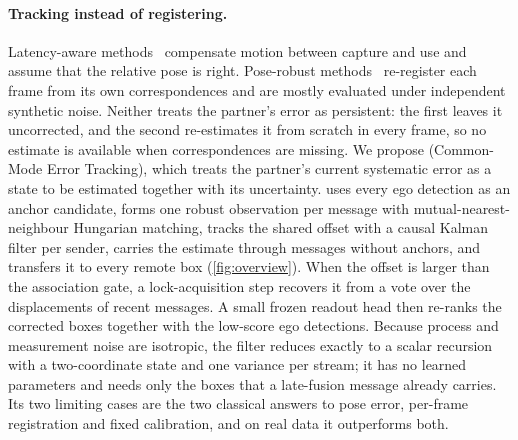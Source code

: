 \paragraph{Tracking instead of registering.}
Latency-aware methods~\cite{lei2022syncnet,wei2023cobevflow,yu2023ffnet,yang2023how2comm,song2025trafalign} compensate motion between capture and use and assume that the relative pose is right.
Pose-robust methods~\cite{lu2023coalign,lei2024freealign,huang2024roco,song2023cbm} re-register each frame from its own correspondences and are mostly evaluated under independent synthetic noise.
Neither treats the partner's error as persistent: the first leaves it uncorrected, and the second re-estimates it from scratch in every frame, so no estimate is available when correspondences are missing.
We propose \method (Common-Mode Error Tracking), which treats the partner's current systematic error as a state to be estimated together with its uncertainty.
\method uses every ego detection as an anchor candidate, forms one robust observation per message with mutual-nearest-neighbour Hungarian matching, tracks the shared offset with a causal Kalman filter per sender, carries the estimate through messages without anchors, and transfers it to every remote box (\cref{fig:overview}).
When the offset is larger than the association gate, a lock-acquisition step recovers it from a vote over the displacements of recent messages.
A small frozen readout head then re-ranks the corrected boxes together with the low-score ego detections.
Because process and measurement noise are isotropic, the filter reduces exactly to a scalar recursion with a two-coordinate state and one variance per stream; it has no learned parameters and needs only the boxes that a late-fusion message already carries.
Its two limiting cases are the two classical answers to pose error, per-frame registration and fixed calibration, and on real data it outperforms both.

